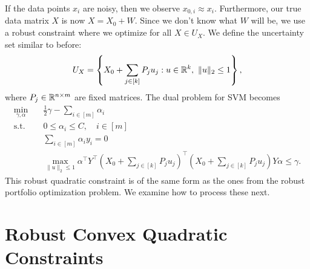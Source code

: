 \documentclass[11pt,oneside]{article}
\theoremstyle{plain}
\theoremstyle{definition}
\theoremstyle{remark}
\begin{document}
If the data points $x_i$ are noisy, then we observe $x_{0,i} \approx x_i$. Furthermore, our true data matrix $X$ is now $X = X_0 + W$. Since we don't know what $W$ will be, we use a robust constraint where we optimize for all $X \in U_X$. We define the uncertainty set similar to before:
\[U_X = \left\{ X_0 + \sum_{j \in [k]} P_j u_j : u \in \mathbb{R}^k, \ \|u\|_2 \leq 1 \right\},\]
where $P_j \in \mathbb{R}^{n \times m}$ are fixed matrices. The dual problem for SVM becomes
\begin{align*}
\min_{\gamma,\alpha} &\quad \frac{1}{2} \gamma - \sum_{i \in [m]} \alpha_i\\
\text{s.t.} &\quad 0 \leq \alpha_i \leq C, \quad i \in [m]\\
&\quad \sum_{i \in [m]} \alpha_i y_i = 0\\
&\quad \max_{\|u\|_2 \leq 1} \alpha^\top Y^\top \left(X_0 + \sum_{j \in [k]} P_j u_j\right)^\top \left(X_0 + \sum_{j \in [k]} P_j u_j\right) Y \alpha \leq \gamma.
\end{align*}
This robust quadratic constraint is of the same form as the ones from the robust portfolio optimization problem. We examine how to process these next.

\section{Robust Convex Quadratic Constraints}
\end{document}
